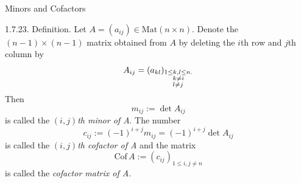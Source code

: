 \documentclass[smaller,hyperref={CJKbookmarks=true}]{beamer}
\begin{document}
\begin{frame}[t]{Minors and Cofactors}
\begin{spacing}{1}
\alert{1.7.23. Definition.} Let $A=(a_{ij})\in\text{Mat}(n\times n)$. Denote the $(n-1)\times (n-1)$ matrix obtained from $A$ by deleting the $i$th row and $j$th column by
\[A_{ij}=(a_{kl})_{\begin{subarray}~1\leq k,l\leq n.\\ ~~~k\neq i\\ ~~~l\neq j\end{subarray}}\]
Then
\[m_{ij}:=\det A_{ij}\]
is called the $(i,j)$\emph{th minor of A}. The number
\[c_{ij}:=(-1)^{i+j}m_{ij}=(-1)^{i+j}\det A_{ij}\]
is called the $(i,j)$\emph{th cofactor of A} and the matrix
\[\text{Cof}\,A:=(c_{ij})_{1\leq i,j\neq n}\]
is called the \emph{cofactor matrix of A}.
\end{spacing}
\end{frame}
\end{document}
